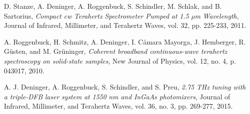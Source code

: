 \begin{thebibliography}{9}

D. Stanze, A. Deninger, A. Roggenbuck, S. Schindler, M. Schlak, and B. Sartorius,
\textit{Compact cw Terahertz Spectrometer Pumped at 1.5 µm Wavelength},
Journal of Infrared, Millimeter, and Terahertz Waves, vol. 32, pp. 225-233, 2011.

A. Roggenbuck, H. Schmitz, A. Deninger, I. Cámara Mayorga, J. Hemberger, R. Güsten, and M. Grüninger,
\textit{Coherent broadband continuous-wave terahertz spectroscopy on solid-state samples},
New Journal of Physics, vol. 12, no. 4, p. 043017, 2010.

A. J. Deninger, A. Roggenbuck, S. Schindler, and S. Preu,
\textit{2.75 THz tuning with a triple-DFB laser system at 1550 nm and InGaAs photomixers},
Journal of Infrared, Millimeter, and Terahertz Waves, vol. 36, no. 3, pp. 269-277, 2015.

\end{thebibliography}

\printbibliography[heading=bibintoc,title=Bibliographie]

\newpage